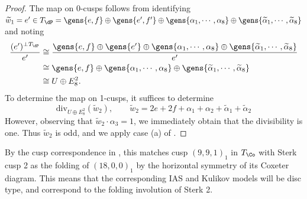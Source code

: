 \documentclass[../main.tex]{subfiles}
\begin{document}
\begin{proof}
    The map on 0-cusps follows from identifying $\tilde w_1 = e' \in T_{\dP} = \gens{e,f} \oplus \gens{e', f'}\oplus \gens{\alpha_1,\cdots,\alpha_8}\oplus \gens{\tilde \alpha_1,\cdots, \tilde \alpha_8}$ and noting
    \begin{align*}
    { (e')^{\perp T_\dP} \over e'} &\cong
    {\gens{e,f} \oplus \gens{e'}\oplus \gens{\alpha_1,\cdots,\alpha_8}\oplus \gens{\tilde \alpha_1,\cdots, \tilde \alpha_8} \over e'} \\
    &\cong 
    \gens{e,f} \oplus \gens{\alpha_1,\cdots,\alpha_8}\oplus \gens{\tilde \alpha_1,\cdots, \tilde \alpha_8} 
    \\ &\cong U \oplus E_8^2.
    \end{align*}
    To determine the map on 1-cusps, it suffices to determine
    \[
    \mathrm{div}_{U\oplus E_8^2}(\tilde w_2), \qquad \tilde w_2 = 2e + 2f + \alpha_1 + \alpha_2 + \tilde \alpha_1 + \tilde \alpha_2
    \]
    However, observing that $\tilde w_2\cdot \alpha_3 = 1$, we immediately obtain that the divisibility is one. Thus $\tilde w_2$ is odd, and we apply case (a) of \cite[Thm. 5.10]{AE22}.
\end{proof}

\begin{remark}
    By the cusp correspondence in \cite{AEGS23}, this matches cusp $(9,9,1)_1$ in $T_\Co$ with Sterk cusp 2 as the folding of $(18,0,0)_1$ by the horizontal symmetry of its Coxeter diagram. This means that the corresponding IAS and Kulikov models will be disc type, and correspond to the folding involution of Sterk 2.
\end{remark}
\end{document}
